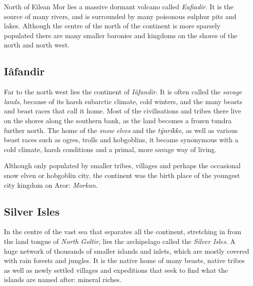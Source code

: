 North of Eilean Mor lies a massive dormant volcano called \emph{Eafiadir}. It
is the source of many rivers, and is surrounded by many poisonous sulphur pits
and lakes. Although the centre of the north of the continent is more sparsely
populated there are many smaller baronies and kingdoms on the shores of the
north and north west.

\subsection*{Iâfandir}

Far to the north west lies the continent of \emph{Iâfandir}. It is often called
the \emph{savage lands}, because of its harsh subarctic climate, cold winters,
and the many beasts and beast races that call it home. Most of the civilisations
and tribes there live on the shores along the southern bank, as the land becomes
a frozen tundra further north. The home of the \emph{snow elves} and the
\emph{týnríkke}, as well as various beast races such as ogres, trolls and
hobgoblins, it became synonymous with a cold climate, harsh conditions and a
primal, more savage way of living.

Although only populated by smaller tribes, villages and perhaps the occasional
snow elven or hobgoblin city, the continent was the birth place of the youngest
city kingdom on Aror: \emph{Morkan}.

\subsection*{Silver Isles}

In the centre of the vast sea that separates all the continent, stretching in
from the land tongue of \emph{North Goltir}, lies the archipelago called the
\emph{Silver Isles}. A huge network of thousands of smaller islands and inlets,
which are mostly covered with rain forests and jungles. It is the native home
of many beasts, native tribes as well as newly settled villages and expeditions
that seek to find what the islands are named after: mineral riches.
